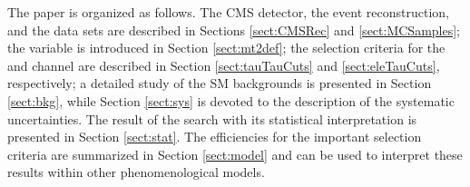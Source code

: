 The paper is organized as follows.  The CMS detector, the event reconstruction, and the data sets are described
in Sections \ref{sect:CMSRec} and \ref{sect:MCSamples}; the \mttwo variable is introduced in Section \ref{sect:mt2def}; 
the selection criteria for the \tauTau and \leptonTau channel are described in Section \ref{sect:tauTauCuts} and \ref{sect:eleTauCuts}, respectively;
a detailed study of the SM backgrounds is presented in Section \ref{sect:bkg}, while Section \ref{sect:sys} 
is devoted to the description of the systematic uncertainties.  The result of the search with its statistical interpretation is presented in 
Section \ref{sect:stat}. The efficiencies for the important selection criteria are summarized in Section \ref{sect:model} and can be
used to interpret these results within other phenomenological models.



